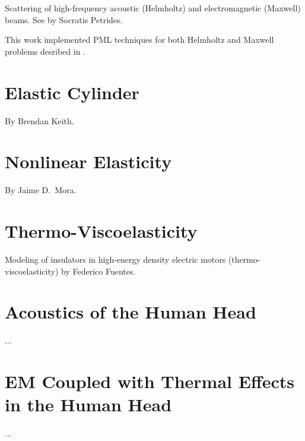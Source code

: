 Scattering of high-frequency acoustic (Helmholtz) and electromagnetic (Maxwell) beams. See \cite{petrides2017adaptive,petrides2019phd,petrides2021adaptive} by Socratis Petrides.

This work implemented PML techniques for both Helmholtz and Maxwell problems desribed in \cite{astaneh2018pml}.

\section{Elastic Cylinder}
\label{sec:hose}

By Brendan Keith.

\section{Nonlinear Elasticity}
\label{sec:nonlinear-elasticity}

By Jaime D.~Mora.

\section{Thermo-Viscoelasticity}
\label{sec:visco-elasticity}

Modeling of insulators in high-energy density electric motors (thermo-viscoelasticity) by Federico Fuentes.

\section{Acoustics of the Human Head}
\label{sec:human-head}

...

\section{EM Coupled with Thermal Effects in the Human Head}
\label{sec:human-head}

...


%


